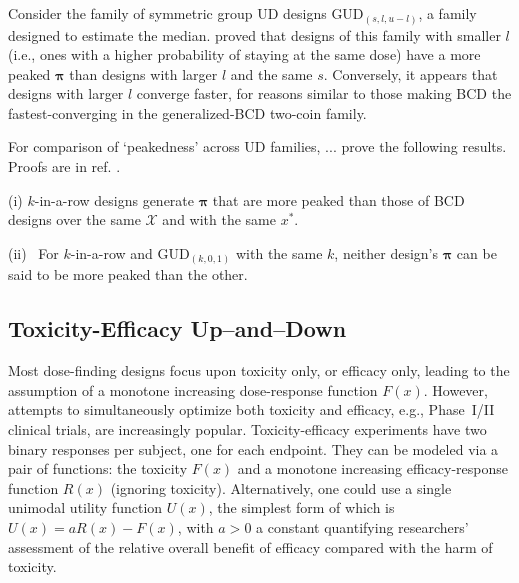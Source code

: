 Consider the family of symmetric group UD designs GUD$_{(s,l,u-l)}$, a family designed to estimate the median. \cite{Oron07} proved that designs of this family with smaller $l$ (i.e., ones with a higher probability of staying at the same dose) have a more peaked $\boldsymbol{\pi}$ than designs with larger $l$ and the same $s$. Conversely, it appears that designs with larger $l$ converge faster, for reasons similar to those making BCD the fastest-converging in the generalized-BCD two-coin family.

For comparison of `peakedness' across UD families, ... prove the following results. Proofs are in ref. \cite{Oron:Hoff:thek:2009}.

\begin{thm}\label{thm:peak} (i) $k$-in-a-row designs generate $\boldsymbol{\pi}$ that are more peaked than those of BCD designs over the same $\mathcal{X}$ and with the same $x^*$.

\noindent (ii) \ For $k$-in-a-row and GUD$_{(k,0,1)}$ with the same $k$, neither design's $\boldsymbol{\pi}$ can be said to be more peaked than the other.
\end{thm}

\subsection{Toxicity-Efficacy Up--and--Down}

Most dose-finding designs focus upon toxicity only, or efficacy only, leading to the assumption of a monotone increasing dose-response function $F(x)$. However, attempts to simultaneously optimize both toxicity and efficacy, e.g., Phase~I/II clinical trials, are increasingly popular. Toxicity-efficacy experiments have two binary responses per subject, one for each endpoint. They can be modeled via a pair of functions: the toxicity $F(x)$ and a monotone increasing efficacy-response function $R(x)$ (ignoring toxicity). Alternatively, one could use a single unimodal utility function $U(x)$, the simplest form of which is $U(x)=aR(x)-F(x)$, with $a>0$ a constant quantifying researchers' assessment of the relative overall benefit of efficacy compared with the harm of toxicity.

